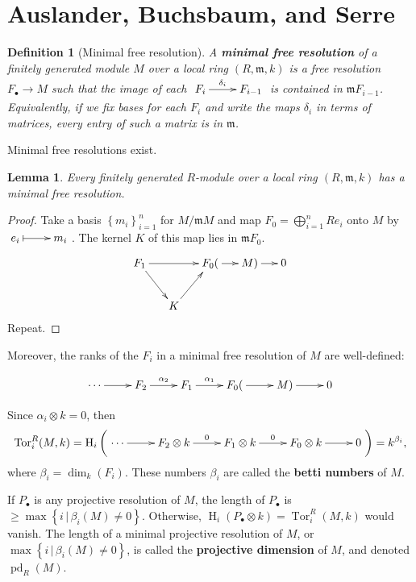 \documentclass[11pt]{book}
\newtheorem{lemma}[theorem]{Lemma}
\newtheorem{definition}[theorem]{Definition}
\numberwithin{equation}{section}
\numberwithin{theorem}{chapter}
\theoremstyle{definition}
\newtheorem*{basic properties}{Basic Properties}
\newtheorem*{Important Remark}{Important Remark}
\theoremstyle{remark}
\newcommand{\m}{\mathfrak{m}}
\newcommand{\Tor}{\operatorname{Tor}}
\renewcommand{\dim}{\operatorname{dim}}
\newcommand{\pd}{\operatorname{pd}}
\renewcommand{\H}{\operatorname{H}}
\begin{document}
\section{Auslander, Buchsbaum, and Serre}


\begin{definition}[Minimal free resolution]
	A {\bf minimal free resolution} of a finitely generated module $M$ over a local ring $(R, \m, k)$ is a free resolution $F_\bullet \longrightarrow M$ such that the image of each $\xymatrix{F_i \ar[r]^-{\delta_i} & F_{i-1}}$ is contained in $\m F_{i-1}$. Equivalently, if we fix bases for each $F_i$ and write the maps $\delta_i$ in terms of matrices, every entry of such a matrix is in $\m$.
\end{definition}


Minimal free resolutions exist.

\begin{lemma}
	Every finitely generated $R$-module over a local ring $(R, \m, k)$ has a minimal free resolution.
\end{lemma}

\begin{proof}
	Take a basis $\left\lbrace m_i \right\rbrace_{i = 1}^n$ for $M/ \m M$ and map $F_0 = \bigoplus_{i=1}^n R e_i$ onto $M$ by $\xymatrix{e_i \ar@{|->}[r] & m_i}$. The kernel $K$ of this map lies in $\m F_0$.
	$$\xymatrix@C=5mm{F_1 \ar[rd] \ar[rr] && F_0 (\ar[r] & M ) \ar[r] & 0 \\ & K \ar[ru]}$$
	Repeat.
\end{proof}


Moreover, the ranks of the $F_i$ in a minimal free resolution of $M$ are well-defined:

$$\xymatrix{\cdots \ar[r] & F_2 \ar[r]^-{\alpha_2} & F_1 \ar[r]^-{\alpha_1} & F_0 (\ar[r] & M) \ar[r] & 0}$$

Since $\alpha_i \otimes k = 0$, then
$$\Tor^R_i(M,k) = \H_i \left( \xymatrix{\cdots \ar[r] & F_2 \otimes k \ar[r]^-{0} & F_1 \otimes k \ar[r]^-{0} & F_0 \otimes k \ar[r] & 0} \right) = k^{\beta_i},$$
where $\beta_i = \dim_k (F_i)$. These numbers $\beta_i$ are called the {\bf betti numbers}  of $M$.


If $P_\bullet$ is any projective resolution of $M$, the length of $P_\bullet$ is $\geqslant \max \left\lbrace i \, | \, \beta_i(M) \neq 0 \right\rbrace$. Otherwise, $\H_i(P_\bullet \otimes k) = \Tor^R_i(M,k)$ would vanish. The length of a minimal projective resolution of $M$, or $\max \left\lbrace i \, | \, \beta_i(M) \neq 0 \right\rbrace$, is called the {\bf projective dimension}  of $M$, and denoted $\pd_R(M)$.
\end{document}
